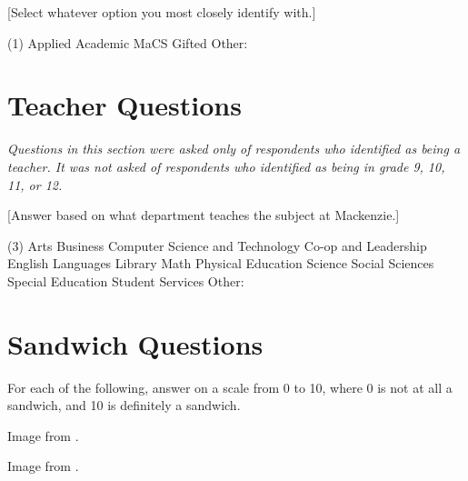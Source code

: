 	\begin{minipage}{\textwidth}
		[Select whatever option you most closely identify with.]
		\begin{singlechoice}(1)
			\choice Applied
			\choice Academic
			\choice MaCS
			\choice Gifted
			\choice Other: \blank
		\end{singlechoice}
	\end{minipage}

\clearpage
\section{Teacher Questions}
	\textit{Questions in this section were asked only of respondents who identified as being a teacher.
	It was not asked of respondents who identified as being in grade 9, 10, 11, or 12.}

	\begin{minipage}{\textwidth}
		[Answer based on what department teaches the subject at Mackenzie.]
		\begin{multiplechoice}(3)
			\choice Arts
			\choice Business
			\choice Computer Science and Technology
			\choice Co-op and Leadership
			\choice English
			\choice Languages
			\choice Library
			\choice Math
			\choice Physical Education
			\choice Science
			\choice Social Sciences
			\choice Special Education
			\choice Student Services
			\choice Other: \blank
		\end{multiplechoice}
	\end{minipage}

\clearpage
\section{Sandwich Questions}
	For each of the following, answer on a scale from 0 to 10, where 0 is not at all a sandwich, and 10 is definitely a sandwich.

	\begin{minipage}{\textwidth}
		Image from \cite{hamSandwich}.
	\end{minipage}

	\begin{minipage}{\textwidth}
		Image from \cite{bltSandwich}.
	\end{minipage}


